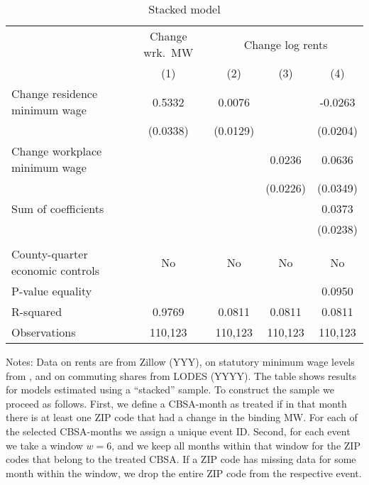 \begin{table}[hbt!] \centering
	\caption{Stacked model}
	\label{tab:stacked_w6}
	\begin{tabular}{l*{4}{c}}
		\toprule
		& \multicolumn{1}{c}{Change wrk.\ MW}
		& \multicolumn{3}{c}{Change log rents}                            \\ \cmidrule(lr){2-2}\cmidrule(lr){3-5}
		                                   & (1)   & (2)   & (3)   & (4)      \\ \midrule
		Change residence minimum wage      &  0.5332  &  0.0076  &       &  -0.0263     \\
		                                   & (0.0338) & (0.0129) &       & (0.0204)    \\
		Change workplace minimum wage      &       &       &  0.0236  & 0.0636      \\
		                                   &       &       & (0.0226) & (0.0349)    \\ \midrule
		Sum of coefficients                &       &       &       &  0.0373     \\
		                                   &       &       &       & (0.0238)    \\
		                                   &       &       &       &          \\ \midrule
		County-quarter economic controls   &   No  & No    & No    & No       \\
		P-value equality                   &       &       &       & 0.0950      \\
		R-squared                          &  0.9769  &  0.0811  &  0.0811  & 0.0811      \\
		Observations                       & 110,123  & 110,123  & 110,123  & 110,123     \\\bottomrule
	\end{tabular}
    
    \begin{minipage}{.95\textwidth} \footnotesize
        \vspace{2mm}
        Notes: Data on rents are from Zillow (YYY), on statutory minimum wage levels
        from \textcite{VaghulZipperer2016, BerkeleyLaborCenter}, and on commuting 
        shares from LODES (YYYY).
        The table shows results for models estimated using a ``stacked'' sample.
        To construct the sample we proceed as follows.
        First, we define a CBSA-month as treated if in that month there is at least one ZIP 
        code that had a change in the binding MW.
        For each of the selected CBSA-months we assign a unique event ID. 
        Second, for each event we take a window $w = 6$, and we keep all months within that 
        window for the ZIP codes that belong to the treated CBSA.
        If a ZIP code has missing data for some month within the window, we drop the entire 
        ZIP code from the respective event. 
    \end{minipage}
\end{table}
